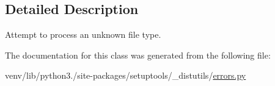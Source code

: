 \subsection{Detailed Description}
\begin{DoxyVerb}Attempt to process an unknown file type.\end{DoxyVerb}
 

The documentation for this class was generated from the following file\+:\begin{DoxyCompactItemize}
\item 
venv/lib/python3./site-\/packages/setuptools/\+\_\+distutils/\hyperlink{__distutils_2errors_8py}{errors.\+py}\end{DoxyCompactItemize}
